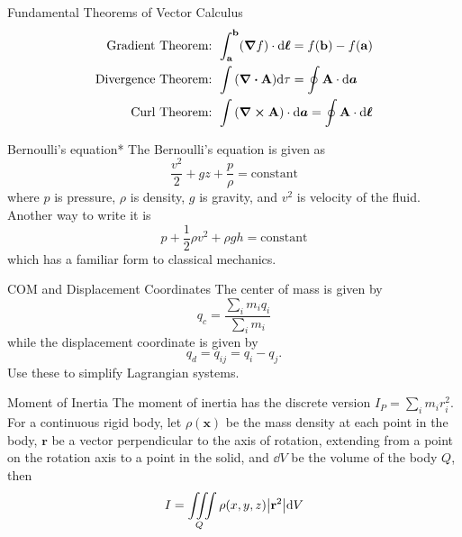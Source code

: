 \documentclass[avery5371,grid]{flashcards}
\begin{document}
\begin{flashcard}[Definition]{Fundamental Theorems of Vector Calculus}
	\begin{align*}
		\text{Gradient Theorem: }&\int_{\mathbf{a}}^{\mathbf{b}} (\grad f)\cdot \dd\boldsymbol{\ell} = f(\mathbf{b}) - f(\mathbf{a}) \\
		\text{Divergence Theorem: }&\int \qty(\div \mathbf{A}) \dd\tau = \oint \mathbf{A} \cdot \dd\boldsymbol{a}\\
		\text{Curl Theorem: }&\int\qty(\curl\mathbf{A})\cdot\dd\boldsymbol{a} = \oint\mathbf{A}\cdot\dd\boldsymbol{\ell} \\
	\end{align*}
\end{flashcard}		

\begin{flashcard}[Definition]{Bernoulli's equation*}
The Bernoulli's equation is given as
	\[ \frac{v^2}{2} + gz + \frac{p}{{\rho}} = \text{constant} \]
	where $p$ is pressure, $\rho$ is density, $g$ is gravity, and $v^2$ is velocity of the fluid. Another way to write it is
	\begin{equation*}
		p + \frac{1}{2}\rho v^2 + \rho g h = \text{constant}
	\end{equation*}
	which has a familiar form to classical mechanics.
\end{flashcard}

\begin{flashcard}[Definition]{COM and Displacement Coordinates}
	The center of mass is given by
	\begin{equation*}
		q_c = \frac{\sum_{i}m_i q_i}{\sum_{i}m_i}
	\end{equation*}
	while the displacement coordinate is given by
	\begin{equation*}
		q_d = q_{ij} = q_i - q_j.
	\end{equation*}
	Use these to simplify Lagrangian systems.
\end{flashcard}

\begin{flashcard}[Definition]{Moment of Inertia}
	The moment of inertia has the discrete version $I_P = \sum_{i} m_i r_i^2$. For a continuous rigid body, let $\rho(\mathbf{x})$ be the mass density at each point in the body, $\mathbf{r}$ be a vector perpendicular to the axis of rotation, extending from a point on the rotation axis to a point in the solid, and $\dd V$ be the volume of the body $Q$, then
	\begin{equation*}
		I = \iiint\limits_{Q} \rho(x,y,z) \abs{\mathbf{r}^2}\dd V
	\end{equation*}
	
\end{flashcard}
\end{document}
